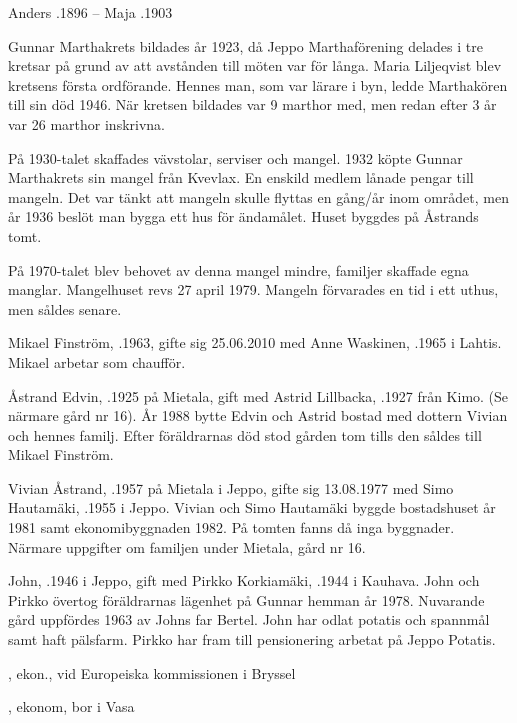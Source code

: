Anders .1896  --  Maja .1903




Gunnar Marthakrets bildades år 1923, då Jeppo Marthaförening delades i tre kretsar på grund av att avstånden till möten var för långa. Maria Liljeqvist blev kretsens första ordförande. Hennes man, som var lärare i byn, ledde Marthakören till sin död 1946. När kretsen bildades var 9 marthor med, men redan efter 3 år var 26 marthor inskrivna.

På 1930-talet skaffades vävstolar, serviser och mangel. 1932 köpte Gunnar Marthakrets sin mangel från Kvevlax. En enskild medlem lånade pengar till mangeln. Det var tänkt att mangeln skulle flyttas en gång/år inom området, men år 1936 beslöt man bygga ett hus för ändamålet. Huset byggdes på Åstrands tomt.

På 1970-talet blev behovet av denna mangel mindre, familjer skaffade egna manglar. Mangelhuset revs 27 april 1979. Mangeln förvarades en tid i ett uthus, men såldes senare.




Mikael Finström, .1963, gifte sig 25.06.2010 med Anne Waskinen, .1965 i Lahtis. Mikael arbetar som chaufför.


Åstrand Edvin, .1925 på Mietala, gift med Astrid Lillbacka, .1927 från Kimo. (Se närmare gård nr 16). År 1988 bytte Edvin och Astrid bostad med dottern Vivian och hennes familj. Efter föräldrarnas död stod gården tom tills den såldes till Mikael Finström.

Vivian Åstrand, .1957  på Mietala i Jeppo, gifte sig 13.08.1977 med Simo Hautamäki, .1955 i Jeppo. Vivian och Simo Hautamäki byggde bostadshuset år 1981 samt ekonomibyggnaden 1982. På tomten fanns då inga byggnader. Närmare uppgifter om familjen under Mietala, gård nr 16.




John, .1946 i Jeppo, gift med Pirkko Korkiamäki, .1944 i Kauhava. John och Pirkko övertog föräldrarnas lägenhet på Gunnar hemman år 1978. Nuvarande gård uppfördes 1963 av Johns far Bertel. John har odlat potatis och spannmål samt haft pälsfarm. Pirkko har fram till pensionering arbetat på Jeppo Potatis.
\begin{jhchildren}
  \item {}, ekon., vid Europeiska kommissionen i Bryssel
  \item {}, ekonom, bor i Vasa
\end{jhchildren}


